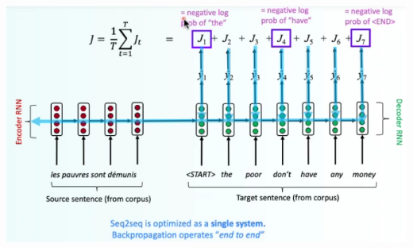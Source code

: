 \documentclass[10pt]{report}
\begin{document}
\begin{center}
	\includegraphics[scale=0.6]{64.png}
\end{center}
\end{document}
